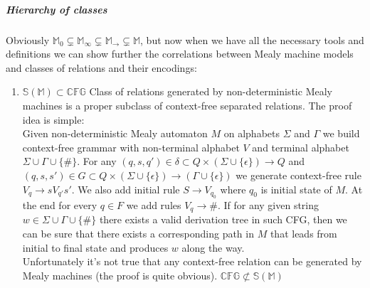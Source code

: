 \documentclass[12pt]{article}
\begin{document}
\subparagraph{Hierarchy of classes} Obviously $\mathbb{M}_0 \subsetneq \mathbb{M}_{\infty}  \subsetneq \mathbb{M}_{\rightarrow}  \subsetneq \mathbb{M} $, but now when we have all the necessary tools and definitions we  can show further the correlations between Mealy machine models and classes of relations and their encodings:
 \begin{enumerate}


\item $\mathbb{S}(\mathbb{M}) \subset \mathbb{CFG}$ Class of relations generated by non-deterministic Mealy machines is a proper subclass of context-free separated relations. The proof idea is simple: \\
Given non-deterministic Mealy automaton $M$ on alphabets $\Sigma$ and $\Gamma$ we build context-free grammar with non-terminal alphabet $V$ and terminal alphabet $\Sigma \cup \Gamma \cup \{\#\}$. For any $(q,s,q') \in \delta \subset Q \times (\Sigma \cup \{\epsilon\}) \rightarrow Q$ and $(q,s,s') \in G \subset Q \times (\Sigma \cup \{\epsilon\}) \rightarrow (\Gamma \cup \{\epsilon\})$ we generate context-free rule $V_q \rightarrow s V_{q'} s'$.  We also add initial rule $S \rightarrow V_{q_0}$ where $q_0$ is initial state of $M$. At the end for every $q \in F$ we add rules $V_q \rightarrow \#$. If for any given string $w \in \Sigma \cup \Gamma \cup \{\#\}$ there exists a valid derivation tree in such CFG, then we can be sure that there exists a corresponding path in $M$ that leads from initial to final state and produces $w$ along the way. \\
Unfortunately it's not true that any context-free relation can be generated by Mealy machines (the proof is quite obvious). $ \mathbb{CFG} \not\subset \mathbb{S}(\mathbb{M})$


\end{enumerate}
\end{document}

